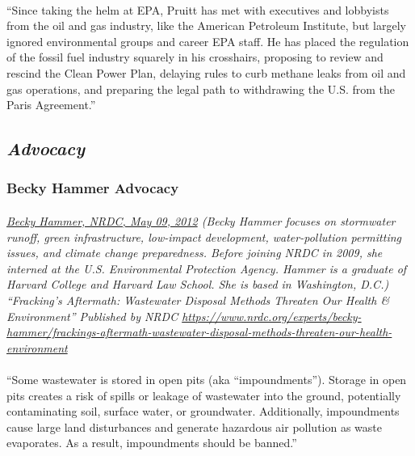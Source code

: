 \documentclass{article}
\begin{document}
\paragraph{}
``Since taking the helm at EPA, Pruitt has met with executives and lobbyists from the oil and gas industry, like the American Petroleum Institute, but largely ignored environmental groups and career EPA staff. He has placed the regulation of the fossil fuel industry squarely in his crosshairs, proposing to review and rescind the Clean Power Plan, delaying rules to curb methane leaks from oil and gas operations, and preparing the legal path to withdrawing the U.S. from the Paris Agreement.”

\subsection{\emph{Advocacy}}

\subsubsection{Becky Hammer Advocacy}
\paragraph{}
\small
\textit{
\underline{Becky Hammer, NRDC, May 09, 2012}
(Becky Hammer focuses on stormwater runoff, green infrastructure, low-impact development, water-pollution permitting issues, and climate change preparedness. Before joining NRDC in 2009, she interned at the U.S. Environmental Protection Agency. Hammer is a graduate of Harvard College and Harvard Law School. She is based in Washington, D.C.) “Fracking's Aftermath: Wastewater Disposal Methods Threaten Our Health \& Environment” Published by NRDC 
\url{https://www.nrdc.org/experts/becky-hammer/frackings-aftermath-wastewater-disposal-methods-threaten-our-health-environment}}
\normalsize

\paragraph{}
``Some wastewater is stored in open pits (aka “impoundments”). Storage in open pits creates a risk of spills or leakage of wastewater into the ground, potentially contaminating soil, surface water, or groundwater. Additionally, impoundments cause large land disturbances and generate hazardous air pollution as waste evaporates. As a result, impoundments should be banned.”
\end{document}
